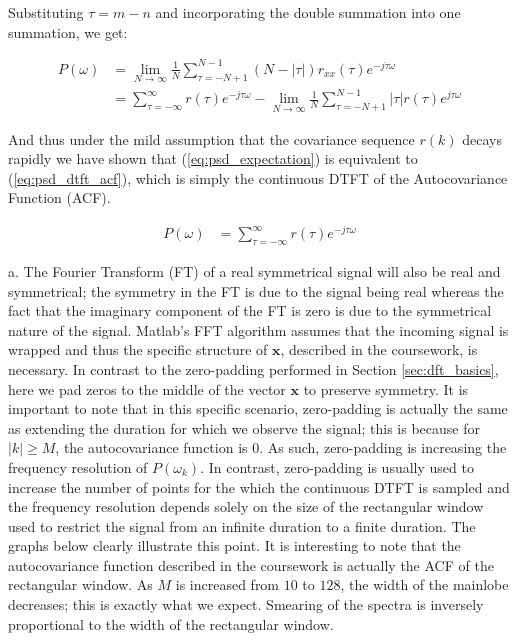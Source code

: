 \noindent{}Substituting $\tau=m-n$ and incorporating the double summation into one summation, we get:

\begin{align}
P(\omega)	&=\lim_{N \to \infty} \frac{1}{N} \sum_{\tau=-N+1}^{N-1}  (N-\lvert \tau \rvert) r_{xx}(\tau) e^{-j\tau\omega} \nonumber \\
			&=\sum_{\tau=-\infty}^{\infty}r(\tau)e^{-j\tau\omega} - \lim_{N \to \infty} \frac{1}{N} \sum_{\tau=-N+1}^{N-1} \lvert \tau \rvert r(\tau) e^{j\tau\omega} \nonumber
\end{align}

\noindent{}And thus under the mild assumption that the covariance sequence $r(k)$ decays rapidly we have shown that (\ref{eq:psd_expectation}) is equivalent to (\ref{eq:psd_dtft_acf}), which is simply the continuous DTFT of the Autocovariance Function (ACF).

\begin{align}
P(\omega)	&= \sum_{\tau=-\infty}^{\infty}r(\tau)e^{-j\tau\omega} \label{eq:psd_dtft_acf}
\end{align}  

\noindent{}a. The Fourier Transform (FT) of a real symmetrical signal will also be real and symmetrical; the symmetry in the FT is due to the signal being real whereas the fact that the imaginary component of the FT is zero is due to the symmetrical nature of the signal. Matlab's FFT algorithm assumes that the incoming signal is wrapped and thus the specific structure of $\textbf{x}$, described in the coursework, is necessary. In contrast to the zero-padding performed in Section \ref{sec:dft_basics}, here we pad zeros to the middle of the vector $\textbf{x}$ to preserve symmetry. It is important to note that in this specific scenario, zero-padding is actually the same as extending the duration for which we observe the signal; this is because for $|k|\geq M$, the autocovariance function is $0$. As such, zero-padding is increasing the frequency resolution of $P(\omega_{k})$. In contrast, zero-padding is usually used to increase the number of points for the which the continuous DTFT is sampled and the frequency resolution depends solely on the size of the rectangular window used to restrict the signal from an infinite duration to a finite duration. The graphs below clearly illustrate this point. It is interesting to note that the autocovariance function described in the coursework is actually the ACF of the rectangular window. As $M$ is increased from $10$ to $128$, the width of the mainlobe decreases; this is exactly what we expect. Smearing of the spectra is inversely proportional to the width of the rectangular window.

